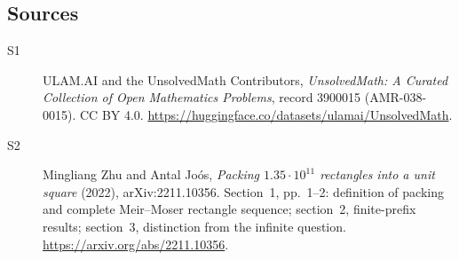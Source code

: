 \documentclass[11pt]{book}
\begin{document}
\subsection{Sources}
\begin{description}
\item[\hypertarget{source:3900015:1}{S1}] ULAM.AI and the UnsolvedMath Contributors, \emph{UnsolvedMath: A Curated Collection of Open Mathematics Problems}, record 3900015 (AMR-038-0015). CC BY 4.0. \url{https://huggingface.co/datasets/ulamai/UnsolvedMath}.
\item[\hypertarget{source:3900015:2}{S2}] Mingliang Zhu and Antal Jo\'os, \emph{Packing $1.35\cdot10^{11}$ rectangles into a unit square} (2022), arXiv:2211.10356. Section~1, pp.~1--2: definition of packing and complete Meir--Moser rectangle sequence; section~2, finite-prefix results; section~3, distinction from the infinite question. \url{https://arxiv.org/abs/2211.10356}.
\end{description}
\label{end:3900015}
\end{document}

